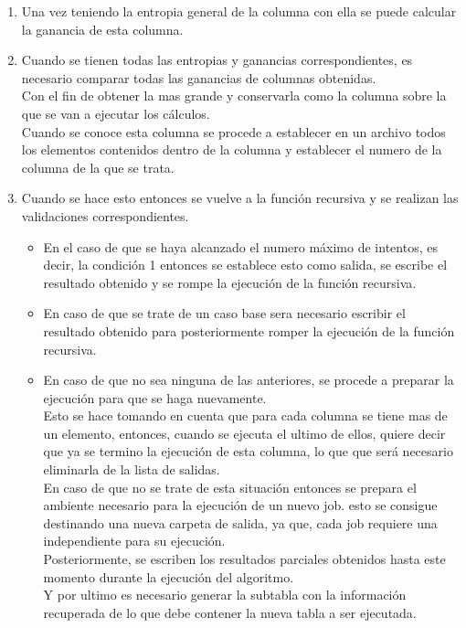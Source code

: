 \begin{enumerate}
	\item Una vez teniendo la entropia general de la columna con ella se puede calcular la ganancia de esta columna.
	\item Cuando se tienen todas las entropias y ganancias correspondientes, es necesario comparar todas las ganancias de columnas obtenidas.\\
	Con el fin de obtener la mas grande y conservarla como la columna sobre la que se van a ejecutar los cálculos.
	\\
	Cuando se conoce esta columna se procede a establecer en un archivo todos los elementos contenidos dentro de la columna y establecer el numero de la columna de la que se trata.
	\item Cuando se hace esto entonces se vuelve a la función recursiva y se realizan las validaciones correspondientes.\\
	\begin{itemize}
		\item En el caso de que se haya alcanzado el numero máximo de intentos, es decir, la condición 1 entonces se establece esto como salida, se escribe el resultado obtenido y se rompe la ejecución de la función recursiva.\\
		\item En caso de que se trate de un caso base sera necesario escribir el resultado obtenido para posteriormente romper la ejecución de la función recursiva.\\
		\item En caso de que no sea ninguna de las anteriores, se procede a preparar la ejecución para que se haga nuevamente.
		\\Esto se hace tomando en cuenta que para cada columna se tiene mas de un elemento, entonces, cuando se ejecuta el ultimo de ellos, quiere decir que ya se termino la ejecución de esta columna, lo que que será necesario eliminarla de la lista de salidas.\\
		En caso de que no se trate de esta situación entonces se prepara el ambiente necesario para la ejecución de un nuevo job. esto se consigue destinando una nueva carpeta de salida, ya que, cada job requiere una independiente para su ejecución.
		\\
		Posteriormente, se escriben los resultados parciales obtenidos hasta este momento durante la ejecución del algoritmo.\\
		Y por ultimo es necesario generar la subtabla con la información recuperada de lo que debe contener la nueva tabla a ser ejecutada. 
	\end{itemize}
\end{enumerate}
